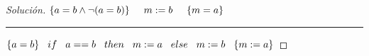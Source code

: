 \begin{proof}[Solución]
\newline
$ \{a=b \wedge \neg (a=b) \} \hspace*{.5cm}  m:=b \hspace*{.5cm} \{m=a \} $
\newline
\noindent\rule{10.5cm}{0.4pt}
\newline
$ \{a = b \} \hspace*{0.3cm} if \hspace*{0.3cm} a == b \hspace*{0.3cm} then \hspace*{0.3cm} m := a \hspace*{0.3cm} else \hspace*{0.3cm} 
m := b \hspace*{0.3cm} \{m := a \}  $

\end{proof}